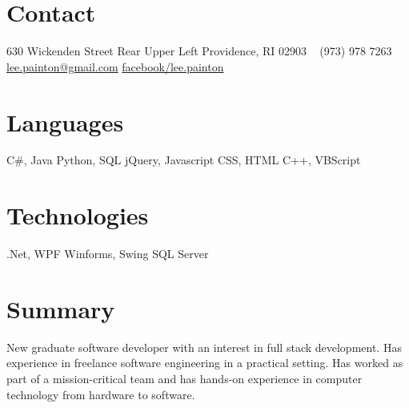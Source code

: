 \documentclass[]{friggeri-cv} %
\begin{document}


\begin{aside} %
\section{\color{brown}Con\color{black}tact}
630 Wickenden Street
Rear Upper Left
Providence, RI 02903
~
(973) 978 7263
~
\href{mailto:lee.painton@gmail.com}{lee.painton@gmail.com}
\href{https://www.facebook.com/lee.painton}{facebook/lee.painton}
\section{\color{violet}Lang\color{black}uages}
{\LARGE C\#, Java}
{\large Python, SQL}
{jQuery, Javascript}
{\small CSS, HTML}
{\footnotesize C++, VBScript}
\section{\color{olive}Tech\color{black}nologies}
{\LARGE .Net, WPF}
{\large Winforms, Swing}
{SQL Server}
\end{aside}


\section{Summary}

New graduate software developer with an interest in full stack development.  Has experience in freelance software engineering in a practical setting.  Has worked as part of a mission-critical team and has hands-on experience in computer technology from hardware to software.

\end{document}
